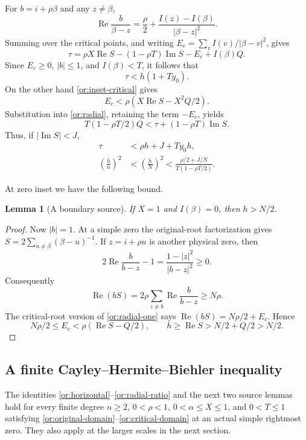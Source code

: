 \documentclass[11pt,reqno]{amsart}
\numberwithin{equation}{section}
\newtheorem{lemma}[theorem]{Lemma}
\theoremstyle{definition}
\theoremstyle{remark}
\renewcommand{\Re}{\operatorname{Re}}
\renewcommand{\Im}{\operatorname{Im}}
\begin{document}
For $b=i+\rho\beta$ and any $z\ne\beta$,
\begin{equation}\label{or:radial-one}
 \Re\frac b{\beta-z}
       =\frac\rho2+\frac{I(z)-I(\beta)}{|\beta-z|^2}.
\end{equation}
Summing over the critical points, and writing
$E_c=\sum_v I(v)/|\beta-v|^2$, gives
\begin{equation}\label{or:radial}
 \tau=\rho X\Re S-(1-\rho T)\Im S-E_c+I(\beta)Q.
\end{equation}
Since $E_c\ge0$, $|b|\le1$, and $I(\beta)<T$, it follows that
\begin{equation}\label{or:radial-unphased}
                         \tau<h(1+Ty_0).
\end{equation}
On the other hand \eqref{or:inset-critical} gives
\[
            E_c<\rho(X\Re S-X^2Q/2).
\]
Substitution into \eqref{or:radial}, retaining the term $-E_c$, yields
\begin{equation}\label{or:radial-sharp}
 T(1-\rho T/2)Q<\tau+(1-\rho T)\Im S.
\end{equation}
Thus, if $|\Im S|<J$,
\begin{align}
 \tau&<\rho h+J+Ty_0h,\label{or:radial-phase}\\
 \left(\frac hn\right)^2
 &<\left(\frac hN\right)^2
 <\frac{\rho/2+J/N}{T(1-\rho T/2)}.\label{or:radial-ratio}
\end{align}

At zero inset we have the following bound.
\begin{lemma}[A boundary source]\label{or:zero-inset}
If $X=1$ and $I(\beta)=0$, then $h>N/2$.
\end{lemma}
\begin{proof}
Now $|b|=1$.  At a simple zero the original-root factorization gives
$S=2\sum_{u\ne\beta}(\beta-u)^{-1}$.  If $z=i+\rho u$ is another
physical zero, then
\[
 2\Re\frac b{b-z}-1=\frac{1-|z|^2}{|b-z|^2}\ge0.
\]
Consequently
\[
 \Re(bS)=2\rho\sum_{z\ne b}\Re\frac b{b-z}\ge N\rho.
\]
The critical-root version of \eqref{or:radial-one} says
$\Re(bS)=N\rho/2+E_c$.  Hence
\[
 N\rho/2\le E_c<\rho(\Re S-Q/2),
 \qquad h\ge\Re S>N/2+Q/2>N/2.
\]
\end{proof}

\subsection{A finite Cayley--Hermite--Biehler inequality}

The identities \eqref{or:horizontal}--\eqref{or:radial-ratio} and the
next two source lemmas hold for every finite degree $n\ge2$,
$0<\rho<1$, $0<\alpha\le X\le1$, and $0<T\le1$ satisfying
\eqref{or:original-domain}--\eqref{or:critical-domain} at an actual
simple rightmost zero.  They also apply at the larger scales in the
next section.
\end{document}
